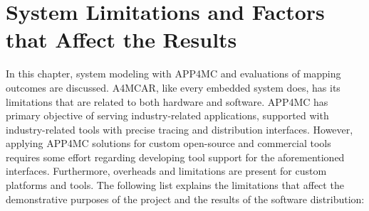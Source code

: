 \section{System Limitations and Factors that Affect the Results} %
In this chapter, system modeling with APP4MC and evaluations of mapping outcomes are discussed. A4MCAR, like every embedded system does, has its limitations that are related to both hardware and software. APP4MC has primary objective of serving industry-related applications, supported with industry-related tools with precise tracing and distribution interfaces. However, applying APP4MC solutions for custom open-source and commercial tools requires some effort regarding developing tool support for the aforementioned interfaces. Furthermore, overheads and limitations are present for custom platforms and tools. The following list explains the limitations that affect the demonstrative purposes of the project and the results of the software distribution:
